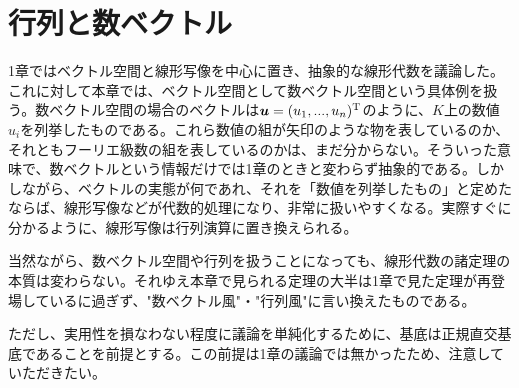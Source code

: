 \documentclass[dvipdfmx, 9pt, a4paper]{jsarticle}
\numberwithin{equation}{subsection}
\newcommand{\bm}[1]{{\mbox{\boldmath $#1$}}}
\begin{document}
\section{行列と数ベクトル}
1章ではベクトル空間と線形写像を中心に置き、抽象的な線形代数を議論した。これに対して本章では、ベクトル空間として数ベクトル空間という具体例を扱う。数ベクトル空間の場合のベクトルは$\bm u=(u_1, ..., u_n)^{\rm T}$のように、$K$上の数値$u_i$を列挙したものである。これら数値の組が矢印のような物を表しているのか、それともフーリエ級数の組を表しているのかは、まだ分からない。そういった意味で、数ベクトルという情報だけでは1章のときと変わらず抽象的である。しかしながら、ベクトルの実態が何であれ、それを「数値を列挙したもの」と定めたならば、線形写像などが代数的処理になり、非常に扱いやすくなる。実際すぐに分かるように、線形写像は行列演算に置き換えられる。\par
当然ながら、数ベクトル空間や行列を扱うことになっても、線形代数の諸定理の本質は変わらない。それゆえ本章で見られる定理の大半は1章で見た定理が再登場しているに過ぎず、"数ベクトル風"・"行列風"に言い換えたものである。\par
ただし、実用性を損なわない程度に議論を単純化するために、基底は正規直交基底であることを前提とする。この前提は1章の議論では無かったため、注意していただきたい。
\end{document}
